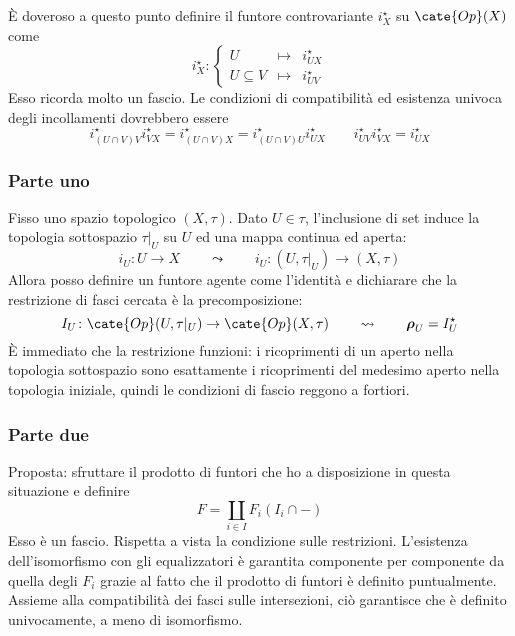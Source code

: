 È doveroso a questo punto definire il funtore controvariante $i^\star_X$ su $\cate{Op}(X)$ come
\[
i^\star_X\colon
\left\{\begin{array}{rcl}
U &\mapsto& i^\star_{UX} \\
U\subseteq V &\mapsto& i^\star_{UV}
\end{array}\right.
\]
Esso ricorda molto un fascio.
Le condizioni di compatibilità ed esistenza univoca degli incollamenti dovrebbero essere
\[
i^\star_{(U\cap V)V}i^\star_{VX} = i^\star_{(U\cap V)X} = i^\star_{(U\cap V)U}i^\star_{UX}
\qquad
i^\star_{UV}i^\star_{VX} = i^\star_{UX}
\]





\subsubsection*{Parte uno}

Fisso uno spazio topologico $(X,\tau)$.
Dato $U\in\tau$, l'inclusione di set induce la topologia sottospazio $\tau\vert_U$ su $U$ ed una mappa continua ed aperta:
\[
i_U\colon U\to X
\qquad\leadsto\qquad
i_U\colon(U,\tau\vert_U)\to(X,\tau)
\]
Allora posso definire un funtore agente come l'identità e dichiarare che la restrizione di fasci cercata è la precomposizione:
\[
I_U\colon\cate{Op}(U,\tau\vert_U)\to\cate{Op}(X,\tau) 
\qquad\leadsto\qquad
\boldsymbol\rho_U = I_U^\star
\]
È immediato che la restrizione funzioni: i ricoprimenti di un aperto nella topologia sottospazio sono esattamente i ricoprimenti del medesimo aperto nella topologia iniziale, quindi le condizioni di fascio reggono a fortiori.




\subsubsection*{Parte due}

Proposta: sfruttare il prodotto di funtori che ho a disposizione in questa situazione e definire
\[ F=\coprod_{i\in I}F_i(I_i\cap-) \]
Esso è un fascio.
Rispetta a vista la condizione sulle restrizioni.
L'esistenza dell'isomorfismo con gli equalizzatori è garantita componente per componente da quella degli $F_i$ grazie al fatto che il prodotto di funtori è definito puntualmente.
Assieme alla compatibilità dei fasci sulle intersezioni, ciò garantisce che è definito univocamente, a meno di isomorfismo.

